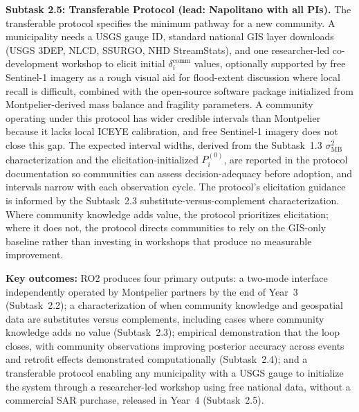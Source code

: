 \documentclass[11pt]{article}
\begin{document}
\textbf{Subtask 2.5: Transferable Protocol
(lead: Napolitano with all PIs).}
The transferable protocol specifies the minimum pathway for a new community. A municipality needs a USGS gauge ID, standard national GIS layer downloads (USGS 3DEP, NLCD, SSURGO,
NHD StreamStats), and one researcher-led co-development workshop to elicit initial
$\delta_i^{\mathrm{comm}}$ values, optionally supported by free Sentinel-1 imagery
as a rough visual aid for flood-extent discussion where local recall is difficult,
combined with the open-source software package
initialized from Montpelier-derived mass balance and fragility parameters.
A community operating under this protocol has wider credible intervals than Montpelier because it lacks local ICEYE calibration, and free Sentinel-1 imagery does not close this gap. The expected interval widths, derived from the Subtask~1.3 $\sigma_{\mathrm{MB}}^2$ characterization and the elicitation-initialized $P_i^{(0)}$, are reported in the protocol documentation so communities can assess decision-adequacy before adoption, and intervals narrow with each observation cycle.
The protocol's elicitation guidance is informed by the Subtask~2.3
substitute-versus-complement characterization. Where community knowledge adds
value, the protocol prioritizes elicitation; where it does not, the protocol
directs communities to rely on the GIS-only baseline rather than investing in
workshops that produce no measurable improvement.

\textbf{Key outcomes:} RO2 produces four primary outputs: a two-mode interface independently operated by Montpelier partners by the end of Year~3 (Subtask~2.2); a characterization of when community knowledge and geospatial data are substitutes versus complements, including cases where community knowledge adds no value (Subtask~2.3); empirical demonstration that the loop closes, with community observations improving posterior accuracy across events and retrofit effects demonstrated computationally (Subtask~2.4); and a transferable protocol enabling any municipality with a USGS gauge to initialize the system through a researcher-led workshop using free national data, without a commercial SAR purchase, released in Year~4 (Subtask~2.5).
\end{document}
